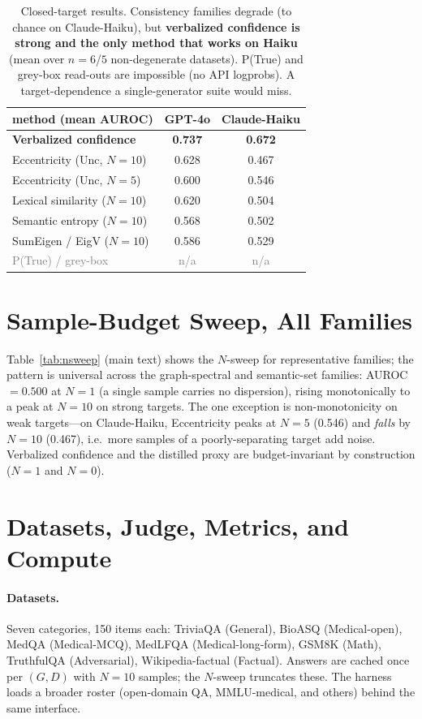 \documentclass[11pt]{article}
\newcommand{\best}[1]{\textbf{#1}}
\newcommand{\grey}[1]{\textcolor{gray}{#1}}
\begin{document}
\begin{table}[t]\centering\small
\setlength{\tabcolsep}{5pt}
\begin{tabular}{l cc}
\toprule
method (mean AUROC) & GPT-4o & Claude-Haiku\\
\midrule
\textbf{Verbalized confidence} & \best{0.737} & \best{0.672}\\
Eccentricity (Unc, $N{=}10$)  & 0.628 & 0.467\\
Eccentricity (Unc, $N{=}5$)   & 0.600 & 0.546\\
Lexical similarity ($N{=}10$) & 0.620 & 0.504\\
Semantic entropy ($N{=}10$)   & 0.568 & 0.502\\
SumEigen / EigV ($N{=}10$)    & 0.586 & 0.529\\
\midrule
\grey{P(True) / grey-box}     & \grey{n/a} & \grey{n/a}\\
\bottomrule
\end{tabular}
\caption{Closed-target results. Consistency families degrade (to chance on Claude-Haiku),
but \textbf{verbalized confidence is strong and the only method that works on Haiku}
(mean over $n{=}6$/$5$ non-degenerate datasets). P(True) and grey-box read-outs are
impossible (no API logprobs). A target-dependence a single-generator suite would miss.}
\label{tab:app-closed}
\end{table}

\section{Sample-Budget Sweep, All Families}\label{app:nsweep}
Table~\ref{tab:nsweep} (main text) shows the $N$-sweep for representative families; the
pattern is universal across the graph-spectral and semantic-set families: AUROC $=0.500$
at $N{=}1$ (a single sample carries no dispersion), rising monotonically to a peak at
$N{=}10$ on strong targets. The one exception is non-monotonicity on weak targets---on
Claude-Haiku, Eccentricity peaks at $N{=}5$ (0.546) and \emph{falls} by $N{=}10$
(0.467), i.e.\ more samples of a poorly-separating target add noise. Verbalized confidence
and the distilled proxy are budget-invariant by construction ($N{=}1$ and $N{=}0$).

\section{Datasets, Judge, Metrics, and Compute}\label{app:details}
\paragraph{Datasets.} Seven categories, 150 items each: TriviaQA (General), BioASQ
(Medical-open), MedQA (Medical-MCQ), MedLFQA (Medical-long-form), GSM8K (Math), TruthfulQA
(Adversarial), Wikipedia-factual (Factual). Answers are cached once per $(G,D)$ with $N{=}10$
samples; the $N$-sweep truncates these. The harness loads a broader roster (open-domain QA,
MMLU-medical, and others) behind the same interface.
\end{document}
